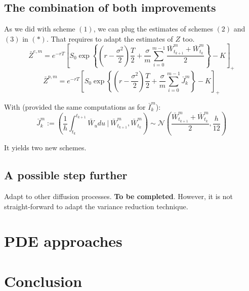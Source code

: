 \documentclass{article}
\begin{document}
\subsection{The combination of both improvements}

As we did with scheme $(1)$, we can plug the estimates of schemes $(2)$ and $(3)$ in $(\ast)$. That requires
to adapt the estimates of $Z$ too.
\begin{equation}
	\bar Z^{e, m} = e^{-rT} \left[ S_0 \exp \left\{ \left( r - \frac{\sigma^2}{2} \right) \frac{T}{2} +
		\frac{\sigma}{m} \sum_{i=0}^{m-1} \frac{\bar W_{t_{k+1}}^m + \bar W_{t_k}^m}{2} \right\} - K \right]_+
	\tag{$ii$}
\end{equation}
\begin{equation}
	\bar Z^{p, m} = e^{-rT} \left[ S_0 \exp \left\{ \left( r - \frac{\sigma^2}{2} \right) \frac{T}{2} +
		\frac{\sigma}{m} \sum_{i=0}^{m-1} \bar J_k^m \right\} - K \right]_+
	\tag{$iii$}
\end{equation}

With (provided the same computations as for $\bar I_k^m$):
\[
	\bar J_k^m := \left( \frac{1}{h} \int_{t_k}^{t_{k+1}} \bar W_u du \ \Big\vert \ \bar W_{t_{k+1}}^m, \bar W_{t_k}^m \right)
	\sim \mathcal N \left( \frac{\bar W_{t_{k+1}}^m + \bar W_{t_k}^m}{2}, \frac{h}{12} \right)
\]

It yields two new schemes.

\subsection{A possible step further}

Adapt to other diffusion processes. \textbf{To be completed}. However, it is not straight-forward to adapt the
variance reduction technique.

\section{PDE approaches}

\section*{Conclusion}


{}

\end{document}
